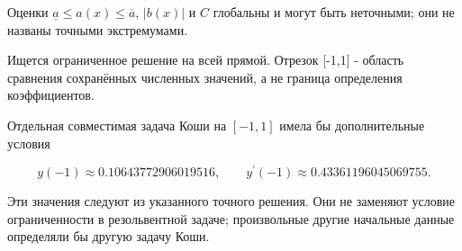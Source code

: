 Оценки $\underline a\le a(x)\le\overline a$, $|b(x)|$ и $C$ глобальны и могут быть неточными; они не названы точными экстремумами.

Ищется ограниченное решение на всей прямой. Отрезок [-1,1] - область сравнения сохранённых численных значений, а не граница определения коэффициентов.

Отдельная совместимая задача Коши на $[-1,1]$ имела бы дополнительные условия

\[y(-1)\approx0.10643772906019516,\qquad y^\prime(-1)\approx0.43361196045069755.\]

Эти значения следуют из указанного точного решения. Они не заменяют условие ограниченности в резольвентной задаче; произвольные другие начальные данные определяли бы другую задачу Коши.
